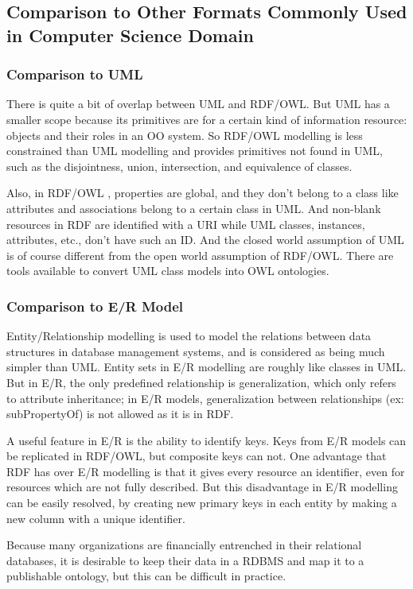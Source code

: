 \documentclass[10pt,journal,compsoc]{IEEEtran}
\begin{document}
\subsection{Comparison to Other Formats Commonly Used in Computer Science Domain}
\subsubsection{Comparison to UML}
There is quite a bit of overlap between UML and RDF/OWL.  But UML has a smaller scope because its primitives are for a certain kind of information resource: objects and their roles in an OO system.  So RDF/OWL modelling is less constrained than UML modelling and provides primitives not found in UML, such as the disjointness, union, intersection, and equivalence of classes.

Also, in RDF/OWL , properties are global, and they don’t belong to a class like attributes and associations belong to a certain class in UML.  And non-blank resources in RDF are identified with a URI while UML classes, instances, attributes, etc.,  don’t have such an ID.  And the closed world assumption of UML is of course different from the open world assumption of RDF/OWL.  There are tools available to convert UML class models into OWL ontologies.

\subsubsection{Comparison to E/R Model}
Entity/Relationship modelling is used to model the relations between data structures in database management systems, and is considered as being much simpler than UML.  Entity sets in E/R modelling are roughly like classes in UML.  But in E/R, the only predefined relationship is generalization, which only refers to attribute inheritance; in E/R models, generalization between relationships (ex: subPropertyOf) is not allowed as it is in RDF.  




A useful feature in E/R is the ability to identify keys.  Keys from E/R models can be replicated in RDF/OWL, but composite keys can not.  One advantage that RDF has over E/R modelling is that it gives every resource an identifier, even for resources which are not fully described.  But this disadvantage in E/R modelling can be easily resolved, by creating new primary keys in each entity by making a new column with a unique identifier.

Because many organizations are financially entrenched in their relational databases, it is desirable to keep their data in a RDBMS and map it to a publishable ontology, but this can be difficult in practice.  
\end{document}
